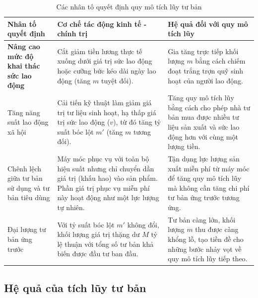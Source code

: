 \begin{table}[H]
\centering
\renewcommand{\arraystretch}{1.5} %
\setlength{\arrayrulewidth}{0.5pt}

\begin{tabularx}{\textwidth}{| >{\raggedright\arraybackslash\bfseries}p{3.5cm} | >{\raggedright\arraybackslash}X | >{\raggedright\arraybackslash}X |}
\hline
\rowcolor[HTML]{EFEFEF}
Nhân tố quyết định & Cơ chế tác động kinh tế - chính trị & Hệ quả đối với quy mô tích lũy \\ \hline

Nâng cao mức độ khai thác sức lao động &
Cắt giảm tiền lương thực tế xuống dưới giá trị sức lao động hoặc cưỡng bức kéo dài ngày lao động (tăng $m$ tuyệt đối). &
Gia tăng trực tiếp khối lượng $m$ bằng cách chiếm đoạt trắng trợn quỹ sinh hoạt của người lao động. \\ \hline

Tăng năng suất lao động xã hội &
Cải tiến kỹ thuật làm giảm giá trị tư liệu sinh hoạt, hạ thấp giá trị sức lao động ($v$), từ đó tăng tỷ suất bóc lột $m'$ (tăng $m$ tương đối). &
Tăng quy mô tích lũy bằng cách cho phép nhà tư bản mua được nhiều tư liệu sản xuất và sức lao động hơn với cùng một lượng tiền. \\ \hline

Chênh lệch giữa tư bản sử dụng và tư bản tiêu dùng &
Máy móc phục vụ với toàn bộ hiệu suất nhưng chỉ chuyển dần giá trị (khấu hao) vào sản phẩm. Phần giá trị phục vụ miễn phí này hoạt động như một lực lượng tự nhiên. &
Tận dụng lực lượng sản xuất miễn phí từ máy móc để tăng quy mô tích lũy mà không cần tăng chi phí tư bản ứng trước tương ứng. \\ \hline

Đại lượng tư bản ứng trước &
Với tỷ suất bóc lột $m'$ không đổi, khối lượng giá trị thặng dư $M$ tỷ lệ thuận với tổng số tư bản khả biến được đầu tư ban đầu. &
Tư bản càng lớn, khối lượng $m$ thu được càng khổng lồ, tạo tiền đề cho những bước nhảy vọt về quy mô tích lũy tiếp theo. \\ \hline
\end{tabularx}
\caption{Các nhân tố quyết định quy mô tích lũy tư bản}
\end{table}

\subsection{Hệ quả của tích lũy tư bản}


